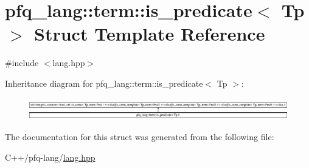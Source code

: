 \hypertarget{structpfq__lang_1_1term_1_1is__predicate}{\section{pfq\-\_\-lang\-:\-:term\-:\-:is\-\_\-predicate$<$ Tp $>$ Struct Template Reference}
\label{structpfq__lang_1_1term_1_1is__predicate}
}


{\ttfamily \#include $<$lang.\-hpp$>$}

Inheritance diagram for pfq\-\_\-lang\-:\-:term\-:\-:is\-\_\-predicate$<$ Tp $>$\-:\begin{figure}[H]
\begin{center}
\leavevmode
\includegraphics[height=0.960549cm]{structpfq__lang_1_1term_1_1is__predicate}
\end{center}
\end{figure}


The documentation for this struct was generated from the following file\-:\begin{DoxyCompactItemize}
\item 
C++/pfq-\/lang/\hyperlink{lang_8hpp}{lang.\-hpp}\end{DoxyCompactItemize}

